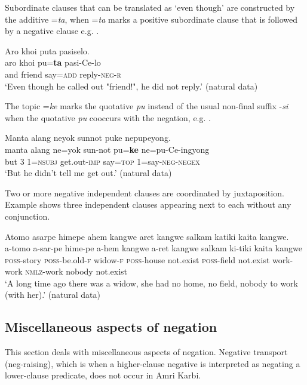 \documentclass[output=paper,colorlinks,citecolor=brown]{langscibook}
\begin{document}
Subordinate clauses that can be translated as ‘even though’ are constructed by the additive =\textit{ta}, when =\textit{ta} marks a positive subordinate clause that is followed by a negative clause e.g. . 


\ea\label{ex:amr:57} Aro khoi puta pasiselo.\\
    \gll aro khoi pu=\textbf{ta} pasi-Ce-lo \\
          and friend say=\textsc{add} reply-\textsc{neg}{}-\textsc{r}\\
    \glt ‘Even though he called out "friend!", he did not reply.’ (natural data)
\z

The topic =\textit{ke} marks the quotative \textit{pu} instead of the usual non-final suffix -\textit{si} when the quotative \textit{pu} cooccurs with the negation, e.g. .

\largerpage
{\ea\label{ex:amr:58}  Manta alang neyok sunnot puke nepupeyong.\\
    \gll manta alang ne=yok sun-not pu=\textbf{ke} ne=pu-Ce-ingyong\\
         but 3 1=\textsc{nsubj} get.out-\textsc{imp} say=\textsc{top} 1=say-\textsc{neg}{}-\textsc{negex} \\
    \glt ‘But he didn’t tell me get out.’ (natural data)
\z}

Two or more negative independent clauses are coordinated by juxtaposition. Example  shows three independent clauses appearing next to each without any conjunction. 

\ea\label{ex:amr:59}Atomo asarpe himepe ahem kangwe aret kangwe salkam katiki kaita kangwe.\\
    \gll a-tomo a-sar-pe hime-pe a-hem kangwe a-ret kangwe salkam ki-tiki kaita kangwe \\
         \textsc{poss}{}-story \textsc{poss}{}-be.old-\textsc{f} widow-\textsc{f} \textsc{poss}{}-house not.exist \textsc{poss}{}-field not.exist work-work \textsc{nmlz}{}-work nobody not.exist\\
    \glt ‘A long time ago there was a widow, she had no home, no field, nobody to work (with her).’ (natural data)
\z

\subsection{Miscellaneous aspects of negation}\label{sec:amr:4.6}
This section deals with miscellaneous aspects of negation. Negative transport (neg-raising), which is when a higher-clause negative is interpreted as negating a lower-clause predicate, does not occur in Amri Karbi.
\end{document}
